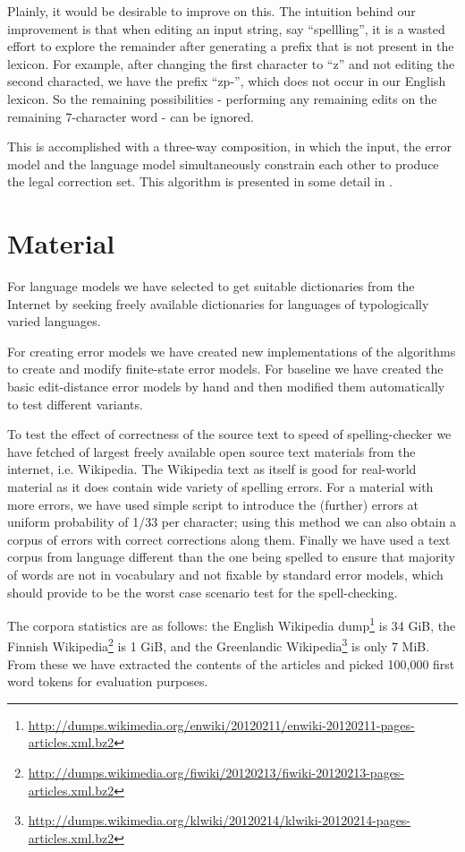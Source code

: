 \documentclass[11pt]{article}
\begin{document}
Plainly, it would be desirable to improve on this. The intuition behind our
improvement is that when editing an input string, say ``spellling'', it is a
wasted effort to explore the remainder after generating a prefix that is not
present in the lexicon. For example, after changing the first character to ``z''
and not editing the second characted, we have the prefix \mbox{``zp-''}, which does
not occur in our English lexicon. So the remaining possibilities - performing
any remaining edits on the remaining $7$-character word - can be ignored.

This is accomplished with a three-way composition, in which the input, the
error model and the language model simultaneously constrain each other to
produce the legal correction set. This algorithm is presented in some detail
in .

\section{Material}
\label{sec:materials}

For language models we have selected to get suitable dictionaries from the
Internet by seeking freely available dictionaries for languages of
typologically varied languages.

For creating error models we have created new implementations of the algorithms
to create and modify finite-state error models. For baseline we have created
the basic edit-distance error models by hand and then modified them
automatically to test different variants.

To test the effect of correctness of the source text to speed of
spelling-checker we have fetched of largest freely available open source text
materials from the internet, i.e. Wikipedia. The Wikipedia text as itself is
good for real-world material as it does contain wide variety of spelling
errors. For a material with more errors, we have used simple script to
introduce the (further) errors at uniform probability of 1/33 per character;
using this method we can also obtain a corpus of errors with correct
corrections along them.  Finally we have used a text corpus from language
different than the one being spelled to ensure that majority of words are not
in vocabulary and not fixable by standard error models, which should provide to
be the worst case scenario test for the spell-checking.

The corpora statistics are as follows: the English Wikipedia
dump\footnote{\url{http://dumps.wikimedia.org/enwiki/20120211/enwiki-20120211-pages-articles.xml.bz2}}
is 34 GiB, the Finnish
Wikipedia\footnote{\url{http://dumps.wikimedia.org/fiwiki/20120213/fiwiki-20120213-pages-articles.xml.bz2}}
is 1 GiB, and the Greenlandic
Wikipedia\footnote{\url{http://dumps.wikimedia.org/klwiki/20120214/klwiki-20120214-pages-articles.xml.bz2}}
is only 7 MiB. From these we have extracted the contents of the articles and
picked 100,000 first word tokens for evaluation purposes.
\end{document}

